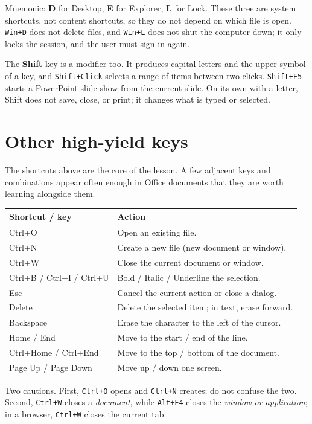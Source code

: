 \documentclass[11pt]{article}
\begin{document}
Mnemonic: \textbf{D} for Desktop, \textbf{E} for Explorer, \textbf{L} for
Lock. These three are system shortcuts, not content shortcuts, so they do not
depend on which file is open. \texttt{Win+D} does not delete files, and
\texttt{Win+L} does not shut the computer down; it only locks the session, and
the user must sign in again.

The \textbf{Shift} key is a modifier too. It produces capital letters and the
upper symbol of a key, and \texttt{Shift+Click} selects a range of items
between two clicks. \texttt{Shift+F5} starts a PowerPoint slide show from the
current slide. On its own with a letter, Shift does not save, close, or print;
it changes what is typed or selected.

\section{Other high-yield keys}
The shortcuts above are the core of the lesson. A few adjacent keys and
combinations appear often enough in Office documents that they are worth
learning alongside them.

\begin{center}
\begin{tabular}{p{}p{}}
\toprule
\textbf{Shortcut / key} & \textbf{Action} \\
\midrule
Ctrl+O & Open an existing file. \\
Ctrl+N & Create a new file (new document or window). \\
Ctrl+W & Close the current document or window. \\
Ctrl+B / Ctrl+I / Ctrl+U & Bold / Italic / Underline the selection. \\
Esc & Cancel the current action or close a dialog. \\
Delete & Delete the selected item; in text, erase forward. \\
Backspace & Erase the character to the left of the cursor. \\
Home / End & Move to the start / end of the line. \\
Ctrl+Home / Ctrl+End & Move to the top / bottom of the document. \\
Page Up / Page Down & Move up / down one screen. \\
\bottomrule
\end{tabular}
\end{center}

Two cautions. First, \texttt{Ctrl+O} opens and \texttt{Ctrl+N} creates; do not
confuse the two. Second, \texttt{Ctrl+W} closes a \emph{document}, while
\texttt{Alt+F4} closes the \emph{window or application}; in a browser,
\texttt{Ctrl+W} closes the current tab.
\end{document}
